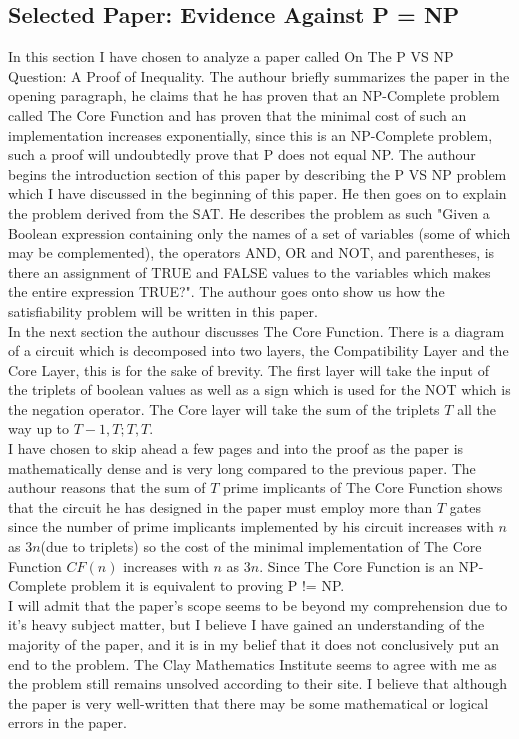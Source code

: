 \documentclass{report}
\begin{document}
\subsection{Selected Paper: Evidence Against P = NP}
In this section I have chosen to analyze a paper called On The P VS NP Question: A Proof of Inequality\cite{P!=NP}.  The authour briefly summarizes the paper in the opening paragraph, he claims that he has proven that an NP-Complete problem called The Core Function and has proven that the minimal cost of such an implementation increases exponentially, since this is an NP-Complete problem, such a proof will undoubtedly prove that P does not equal NP.
The authour begins the introduction section of this paper by describing the P VS NP problem which I have discussed in the beginning of this paper.  He then goes on to explain the problem derived from the SAT\cite{satisfiability}.  He describes the problem as such "Given a Boolean expression containing only the names of a set of variables (some of which may be complemented), the operators AND, OR and NOT, and parentheses, is there an assignment of TRUE and FALSE values to the variables which makes the entire expression TRUE?"\cite{P!=NP}.  The authour goes onto show us how the satisfiability problem will be written in this paper.
\\
In the next section the authour discusses The Core Function.  There is a diagram of a circuit which is decomposed into two layers, the Compatibility Layer and the Core Layer, this is for the sake of brevity.  The first layer will take the input of the triplets of boolean values as well as a sign which is used for the NOT which is the negation operator.  The Core layer will take the sum of the triplets $T$ all the way up to $T - 1, T; T, T$.
\\
I have chosen to skip ahead a few pages and into the proof as the paper is mathematically dense and is very long compared to the previous paper.  The authour reasons that the sum of $T$ prime implicants of The Core Function shows that the circuit he has designed in the paper must employ more than $T$ gates since the number of prime implicants implemented by his circuit increases with $n$ as $3n$(due to triplets) so the cost of the minimal implementation of The Core Function $CF(n)$ increases with $n$ as $3n$.  Since The Core Function is an NP-Complete problem it is equivalent to proving P != NP.
\\
I will admit that the paper's scope seems to be beyond my comprehension due to it's heavy subject matter, but I believe I have gained an understanding of the majority of the paper, and it is in my belief that it does not conclusively put an end to the problem.  The Clay Mathematics Institute seems to agree with me as the problem still remains unsolved according to their site\cite{Millennium}.  I believe that although the paper is very well-written that there may be some mathematical or logical errors in the paper.
\end{document}
